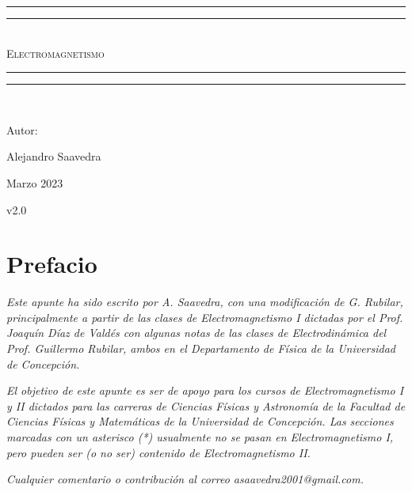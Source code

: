 \documentclass[letterpaper,twoside,12pt]{report}
\newlength{\drop}
\theoremstyle{definition}
\begin{document}
\sffamily

\begin{titlepage}
 \textheight
    \centering
    \vspace*{\baselineskip}
    \rule{\textwidth}{1.6pt}\vspace*{-\baselineskip}\vspace*{2pt}
    \rule{\textwidth}{0.4pt}\\[\baselineskip]
    {\scshape\Huge Electromagnetismo}\\[0.2\baselineskip]
    \rule{\textwidth}{0.4pt}\vspace*{-\baselineskip}\vspace{3.2pt}
    \rule{\textwidth}{1.6pt}\\[\baselineskip]
    {\Large Autor: \par}
{\Large Alejandro Saavedra \par}
\vfill
{\large Marzo 2023 \par}
{\large v2.0 \par}
\end{titlepage}

\chapter*{Prefacio}


\emph{Este apunte ha sido escrito  por A. Saavedra, con una modificación de G. Rubilar, principalmente a partir de las clases de Electromagnetismo I dictadas por el Prof. Joaquín Díaz de Valdés con algunas notas de las clases de Electrodinámica del Prof. Guillermo Rubilar,  ambos en el Departamento de Física de la Universidad de Concepción.}

\emph{El objetivo de este apunte es ser de apoyo para los cursos de Electromagnetismo I y II dictados para las carreras de Ciencias Físicas y Astronomía de la Facultad de Ciencias Físicas y Matemáticas de la Universidad de Concepción. Las secciones marcadas con un asterisco (*) usualmente no se pasan en Electromagnetismo I, pero pueden ser (o no ser) contenido de Electromagnetismo II.}

\emph{Cualquier comentario o contribución al correo \textit{asaavedra2001@gmail.com}.}


\tableofcontents

\pagestyle{mystyle}








\nocite{*} %
\printbibliography[title={Referencias}]
\end{document}
